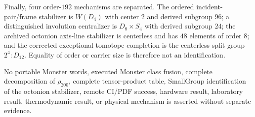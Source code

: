 Finally, four order-$192$ mechanisms are separated. The ordered incident-pair/frame stabilizer is $W(D_4)$ with center $2$ and derived subgroup $96$; a distinguished involution centralizer is $D_8\times S_4$ with derived subgroup $24$; the archived octonion axis-line stabilizer is centerless and has $48$ elements of order $8$; and the corrected exceptional tomotope completion is the centerless split group $2^4:D_{12}$. Equality of order or carrier size is therefore not an identification.

No portable Monster words, executed Monster class fusion, complete decomposition of $\rho_{200}$, complete tensor-product table, SmallGroup identification of the octonion stabilizer, remote CI/PDF success, hardware result, laboratory result, thermodynamic result, or physical mechanism is asserted without separate evidence.

